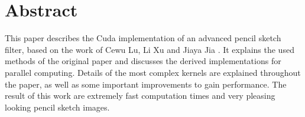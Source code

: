 \section*{Abstract} 
This paper describes the Cuda implementation of an advanced pencil sketch
filter, based on the work of Cewu Lu, Li Xu and Jiaya Jia \cite{mainPaper}.  It
explains the used methods of the original paper and discusses the derived
implementations for parallel computing. Details of the most complex kernels are
explained throughout the paper, as well as some important improvements to gain
performance. The result of this work are extremely fast computation times and
very pleasing looking pencil sketch images.

